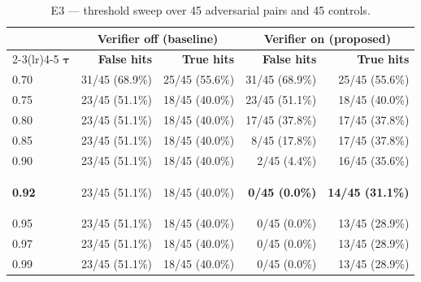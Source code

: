 \documentclass[11pt,a4paper]{article}
\newcommand{\hl}[1]{\colorbox{hlyellow}{\strut #1}}
\begin{document}
\begin{table}[htbp]
\centering
\caption{E3 --- threshold sweep over 45 adversarial pairs and 45 controls.}
\label{tab:calib}
\footnotesize
\begin{tabular}{@{}l rr rr@{}}
\toprule
& \multicolumn{2}{c}{\textbf{Verifier off (baseline)}} &
  \multicolumn{2}{c}{\textbf{Verifier on (proposed)}} \\
\cmidrule(lr){2-3}\cmidrule(lr){4-5}
$\boldsymbol{\tau}$ & \textbf{False hits} & \textbf{True hits} &
                      \textbf{False hits} & \textbf{True hits} \\
\midrule
0.70 & 31/45 (68.9\%) & 25/45 (55.6\%) & 31/45 (68.9\%) & 25/45 (55.6\%) \\
0.75 & 23/45 (51.1\%) & 18/45 (40.0\%) & 23/45 (51.1\%) & 18/45 (40.0\%) \\
0.80 & 23/45 (51.1\%) & 18/45 (40.0\%) & 17/45 (37.8\%) & 17/45 (37.8\%) \\
0.85 & 23/45 (51.1\%) & 18/45 (40.0\%) & \phantom{0}8/45 (17.8\%) & 17/45 (37.8\%) \\
0.90 & 23/45 (51.1\%) & 18/45 (40.0\%) & \phantom{0}2/45 (4.4\%) & 16/45 (35.6\%) \\
\textbf{0.92} & 23/45 (51.1\%) & 18/45 (40.0\%) & \hl{\textbf{0/45 (0.0\%)}} & \textbf{14/45 (31.1\%)} \\
0.95 & 23/45 (51.1\%) & 18/45 (40.0\%) & 0/45 (0.0\%) & 13/45 (28.9\%) \\
0.97 & 23/45 (51.1\%) & 18/45 (40.0\%) & 0/45 (0.0\%) & 13/45 (28.9\%) \\
0.99 & 23/45 (51.1\%) & 18/45 (40.0\%) & 0/45 (0.0\%) & 13/45 (28.9\%) \\
\bottomrule
\end{tabular}
\end{table}
\end{document}
